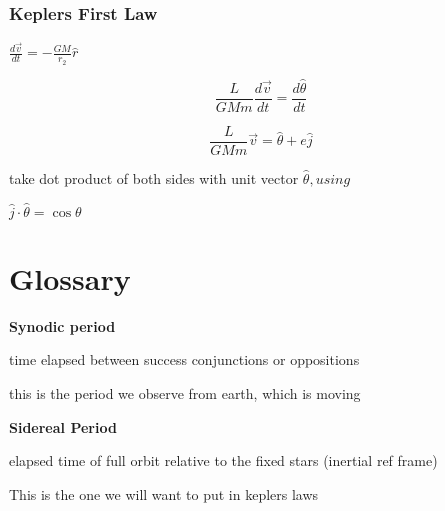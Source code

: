 \documentclass{article}
\begin{document}
\subsubsection{Keplers First Law}
\begin{list}{-}{}
\item $\frac{d\vec{v}}{dt} = -\frac{GM}{r_2}\hat{r}$
\item \[\frac{L}{GMm} \frac{d\vec{v}}{dt} = \frac{d\hat{\theta}}{dt}\]
\item \[\frac{L}{GMm}\vec{v} = \hat{\theta} + e\hat{j}\]
\item take dot product of both sides with unit vector $\hat{\theta}, using$
\item $\hat{j}\cdot\hat{\theta} = \cos\theta$
\item 
\end{list}
























\pagebreak
\section{Glossary}

\textbf{\large Synodic period }

\begin{list}{-}{}
\item time elapsed between success conjunctions or oppositions
\item this is the period we observe from earth, which is moving
\end{list}
\noindent
\textbf{\large Sidereal Period} 
\begin{list}{-}{}
\item elapsed time of full orbit relative to the fixed stars (inertial ref frame)
\item This is the one we will want to put in keplers laws
\end{list}
\end{document}

